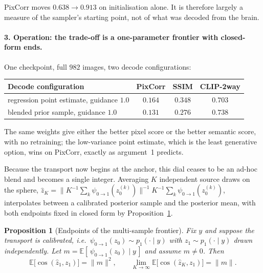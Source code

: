 \documentclass[11pt,a4paper]{article}
\newcommand{\E}{\mathbb{E}}
\theoremstyle{plain}
\newtheorem{proposition}{Proposition}
\theoremstyle{remark}
\begin{document}
PixCorr moves $0.638\to0.913$ on initialisation alone. It is therefore largely a
measure of the sampler's starting point, not of what was decoded from the brain.

\paragraph{3. Operation: the trade-off is a one-parameter frontier with closed-form ends.}
One checkpoint, full $982$ images, two decode configurations:

\begin{center}
\footnotesize
\begin{tabular}{@{}lccc@{}}
\toprule
\textbf{Decode configuration} & \textbf{PixCorr} & \textbf{SSIM} & \textbf{CLIP-2way} \\
\midrule
regression point estimate, guidance $1.0$ & $\mathbf{0.164}$ & $\mathbf{0.348}$ & $0.703$ \\
blended prior sample, guidance $1.0$      & $0.131$ & $0.276$ & $\mathbf{0.738}$ \\
\bottomrule
\end{tabular}
\end{center}

The same weights give either the better pixel score or the better semantic
score, with no retraining; the low-variance point estimate, which is the least
generative option, wins on PixCorr, exactly as argument~1 predicts.

Because the transport now begins at the anchor, this dial ceases to be an
ad-hoc blend and becomes a single integer. Averaging $K$ independent source
draws on the sphere,
$\hat z_K = \big\lVert K^{-1}\sum_k \psi_{0\to1}(z_0^{(k)})\big\rVert^{-1}
K^{-1}\sum_k \psi_{0\to1}(z_0^{(k)})$, interpolates between a calibrated
posterior sample and the posterior mean, with both endpoints fixed in closed
form by Proposition~\ref{prop:mean}.

\begin{proposition}[Endpoints of the multi-sample frontier]
\label{prop:mean}
Fix $y$ and suppose the transport is calibrated, i.e.\
$\psi_{0\to1}(z_0)\sim p_1(\cdot\mid y)$ with
$z_1\sim p_1(\cdot\mid y)$ drawn independently. Let
$m=\E[\,\psi_{0\to1}(z_0)\mid y\,]$ and assume $m\neq0$. Then
\begin{equation}
\E\big[\cos(\hat z_1,z_1)\big]=\lVert m\rVert^{2},
\qquad
\lim_{K\to\infty}\E\big[\cos(\hat z_K,z_1)\big]=\lVert m\rVert .
\end{equation}
\end{proposition}
\end{document}
